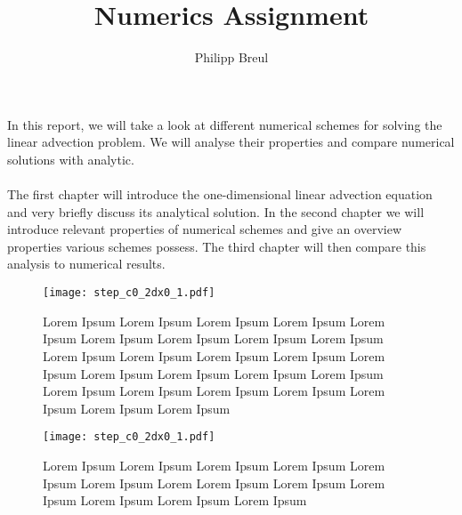 \documentclass[11pt,a4paper,onecolumn]{article}
\author{Philipp Breul}
\title{Numerics Assignment}
\numberwithin{equation}{section} %
\begin{document}
\maketitle
In this report, we will take a look at different numerical schemes for solving the linear advection problem. We will analyse their properties and compare numerical solutions with analytic. \\ \\
The first chapter will introduce the one-dimensional linear advection equation and very briefly discuss its analytical solution. In the second chapter we will introduce relevant properties of numerical schemes and give an overview properties various schemes possess. The third chapter will then compare this analysis to numerical results. 




\FloatBarrier
\begin{figure}
\centering
\texttt{[image: step\_c0\_2dx0\_1.pdf]}
\caption{Lorem Ipsum Lorem Ipsum Lorem Ipsum Lorem Ipsum Lorem Ipsum Lorem Ipsum Lorem Ipsum Lorem Ipsum Lorem Ipsum Lorem Ipsum Lorem Ipsum Lorem Ipsum Lorem Ipsum Lorem Ipsum Lorem Ipsum Lorem Ipsum Lorem Ipsum Lorem Ipsum Lorem Ipsum Lorem Ipsum Lorem Ipsum Lorem Ipsum Lorem Ipsum Lorem Ipsum Lorem Ipsum }

\texttt{[image: step\_c0\_2dx0\_1.pdf]}
\caption{Lorem Ipsum Lorem Ipsum Lorem Ipsum Lorem Ipsum Lorem Ipsum Lorem Ipsum Lorem Lorem Ipsum Lorem Ipsum Lorem Ipsum Lorem Ipsum Lorem Ipsum Lorem Ipsum }
\end{figure}
\end{document}

